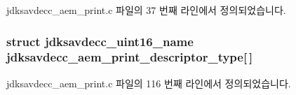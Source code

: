 jdksavdecc\+\_\+aem\+\_\+print.\+c 파일의 37 번째 라인에서 정의되었습니다.

\subsubsection[{\texorpdfstring{jdksavdecc\+\_\+aem\+\_\+print\+\_\+descriptor\+\_\+type}{jdksavdecc_aem_print_descriptor_type}}]{\setlength{\rightskip}{0pt plus 5cm}struct {\bf jdksavdecc\+\_\+uint16\+\_\+name} jdksavdecc\+\_\+aem\+\_\+print\+\_\+descriptor\+\_\+type\mbox{[}$\,$\mbox{]}}\hypertarget{group__aem__print_gabb4f27bdad61aeaf875d91f408b7199d}{}\label{group__aem__print_gabb4f27bdad61aeaf875d91f408b7199d}


jdksavdecc\+\_\+aem\+\_\+print.\+c 파일의 116 번째 라인에서 정의되었습니다.

